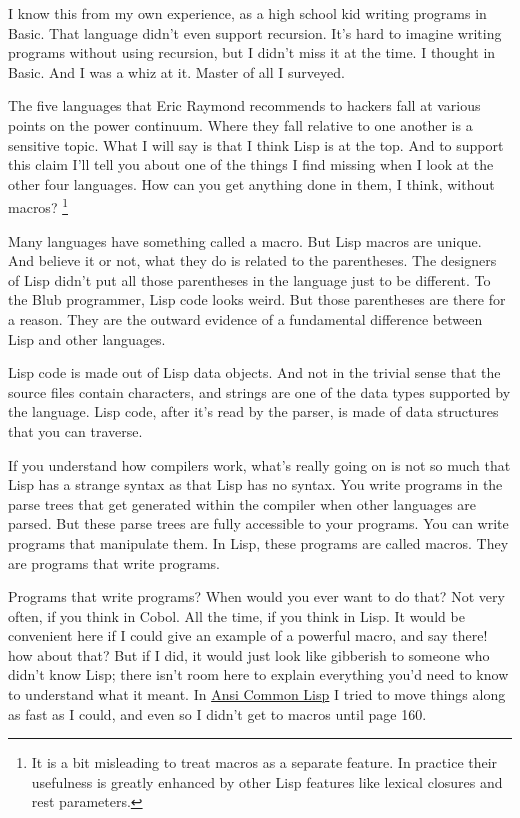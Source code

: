 I know this from my own experience, as a high school kid writing
programs in Basic. That language didn't even support recursion. It's
hard to imagine writing programs without using recursion, but I didn't
miss it at the time. I thought in Basic. And I was a whiz at it. Master
of all I surveyed.

The five languages that Eric Raymond recommends to hackers fall at
various points on the power continuum. Where they fall relative to one
another is a sensitive topic. What I will say is that I think Lisp is at
the top. And to support this claim I'll tell you about one of the things
I find missing when I look at the other four languages. How can you get
anything done in them, I think, without macros? \footnote{It is a bit misleading to treat macros as a separate feature. In
practice their usefulness is greatly enhanced by other Lisp features
like lexical closures and rest parameters.}

Many languages have something called a macro. But Lisp macros are
unique. And believe it or not, what they do is related to the
parentheses. The designers of Lisp didn't put all those parentheses in
the language just to be different. To the Blub programmer, Lisp code
looks weird. But those parentheses are there for a reason. They are the
outward evidence of a fundamental difference between Lisp and other
languages.

Lisp code is made out of Lisp data objects. And not in the trivial sense
that the source files contain characters, and strings are one of the
data types supported by the language. Lisp code, after it's read by the
parser, is made of data structures that you can traverse.

If you understand how compilers work, what's really going on is not so
much that Lisp has a strange syntax as that Lisp has no syntax. You
write programs in the parse trees that get generated within the compiler
when other languages are parsed. But these parse trees are fully
accessible to your programs. You can write programs that manipulate
them. In Lisp, these programs are called macros. They are programs that
write programs.

Programs that write programs? When would you ever want to do that? Not
very often, if you think in Cobol. All the time, if you think in Lisp.
It would be convenient here if I could give an example of a powerful
macro, and say there! how about that? But if I did, it would just look
like gibberish to someone who didn't know Lisp; there isn't room here to
explain everything you'd need to know to understand what it meant. In
\href{acl.html}{Ansi Common Lisp} I tried to move things along as fast
as I could, and even so I didn't get to macros until page 160.

